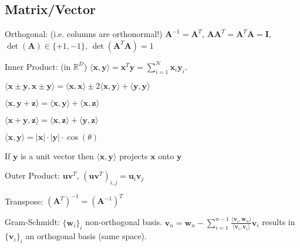 \documentclass[a4paper, 11pt, landscape]{article}
\begin{document}
\begin{multicols*}{3}
\section{Matrix/Vector}
\begin{compactdesc}
	\item[Orthogonal:] (i.e. columns are orthonormal!) $\mathbf{A}^{-1} = \mathbf{A}^T$, $\mathbf{A} \mathbf{A}^T = \mathbf{A}^T \mathbf{A} = \mathbf{I}$, $\operatorname{det}(\mathbf{A}) \in \{+1, -1\}$, $\operatorname{det}(\mathbf{A}^T \mathbf{A}) = 1$
	\item[Inner Product:] (in $\mathbb{R}^D$) $\langle \mathbf{x}, \mathbf{y} \rangle = \mathbf{x}^T \mathbf{y} = \sum_{i=1}^{N} \mathbf{x}_i \mathbf{y}_i$.
	\begin{inparaitem}[\color{red}\textbullet]
		\item $\langle \mathbf{x} \pm \mathbf{y}, \mathbf{x} \pm \mathbf{y} \rangle = \langle \mathbf{x}, \mathbf{x} \rangle \pm 2 \langle \mathbf{x}, \mathbf{y} \rangle + \langle \mathbf{y}, \mathbf{y} \rangle$
		\item $\langle \mathbf{x}, \mathbf{y} + \mathbf{z} \rangle = \langle \mathbf{x}, \mathbf{y} \rangle + \langle \mathbf{x}, \mathbf{z} \rangle$
		\item $\langle \mathbf{x} + \mathbf{y}, \mathbf{z} \rangle = \langle \mathbf{x}, \mathbf{z} \rangle + \langle \mathbf{y}, \mathbf{z} \rangle$
		\item $\langle \mathbf{x}, \mathbf{y} \rangle = |\mathbf{x}| \cdot |\mathbf{y}| \cdot \cos(\theta)$
		\item If $\mathbf{y}$ is a unit vector then $\langle \mathbf{x}, \mathbf{y} \rangle$ projects $\mathbf{x}$ onto $\mathbf{y}$
	\end{inparaitem}
	\item[Outer Product:] $\mathbf{u} \mathbf{v}^T$, $(\mathbf{u} \mathbf{v}^T)_{i, j} = \mathbf{u}_i \mathbf{v}_j$
	\item[Transpose:] $(\mathbf{A}^T)^{-1} = (\mathbf{A}^{-1})^T$
	\item[Gram-Schmidt:] $\{\mathbf{w}_i\}_i$ non-orthogonal basis. $\mathbf{v}_n = \mathbf{w}_n - \sum_{i=1}^{n-1} \frac{\langle \mathbf{v}_i, \mathbf{w}_n \rangle}{\langle \mathbf{v}_i, \mathbf{v}_i \rangle} \mathbf{v}_i$ results in $\{\mathbf{v}_i\}_i$ an orthogonal basis (same space).
\end{compactdesc}


\end{multicols*}
\end{document}
